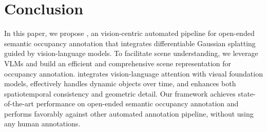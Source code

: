 \section{Conclusion}
In this paper, we propose \ourmethod{}, an vision-centric automated pipeline for open-ended semantic occupancy annotation that integrates differentiable Gaussian splatting guided by vision-language models.
To facilitate scene understanding, we leverage VLMs and build an efficient and comprehensive scene representation for occupancy annotation. \ourmethod{} integrates vision-language attention with visual foundation models, effectively handles dynamic objects over time, and enhances both spatiotemporal consistency and geometric detail. 
Our framework achieves state-of-the-art performance on open-ended semantic occupancy annotation and performs favorably against other automated annotation pipeline, without using any human annotations.

